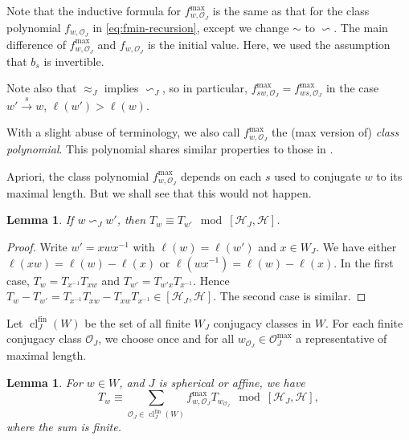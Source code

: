 \documentclass[a4paper, reqno, 14pt]{amsart}
\def\i{{^{-1}}}
\def\co{\mathcal{O}}
\def\ch{\mathcal{H}}
\DeclareMathOperator{\cl}{cl}
\DeclareMathOperator{\fin}{fin}
\newtheorem{lem}[thm]{Lemma}
\theoremstyle{definition}
\theoremstyle{remark}
\numberwithin{equation}{section}
\numberwithin{thm}{section}
\begin{document}
        Note that the inductive formula for $f^{\max}_{w,\co_J}$ is the same as that for the class polynomial $f_{w,\co_J}$ in \cref{eq:fmin-recursion}, except we change $\sim$ to $\backsim$. The main difference of $f^{\max}_{w,\co_J}$ and $f_{w,\co_J}$ is the initial value. Here, we used the assumption that $b_s$ is invertible.

        Note also that $\approx_J$ implies $\backsim_J$, so in particular, $f^{\max}_{s w,\co_J}=f^{\max}_{ws,\co_J}$ in the case $w' \xrightarrow{s} w$, $\ell(w')>\ell(w)$.

        With a slight abuse of terminology, we also call $f^{\max}_{w,\co_J}$ the (max version of) \emph{class polynomial}. This polynomial shares similar properties to those in \cite[\S 8.2]{geck2000characters}.

        Apriori, the class polynomial $f^{\max}_{w,\co_J}$ depends on each $s$ used to conjugate $w$ to its maximal length. But we shall see that this would not happen. 

        
        \begin{lem}\label{lem:sameimg}
            If $w\backsim_J w'$, then $T_w\equiv T_{w'} \mod [\ch_J,\ch]$.
        \end{lem}
        \begin{proof}
            Write $w'=xwx\i$ with $\ell(w)=\ell(w')$ and $x\in W_J$. We have either $\ell(xw)=\ell(w)-\ell(x)$ or $\ell(wx\i)=\ell(w)-\ell(x)$. In the first case, $T_w=T_{x\i}T_{xw}$ and $T_{w'}=T_{w'x}T_{x\i}$. Hence $T_w-T_{w'}=T_{x\i}T_{xw}-T_{xw}T_{x\i}\in [\ch_J,\ch]$. The second case is similar.
        \end{proof}

        Let $\cl^{\fin}_J(W)$ be the set of all finite $W_J$ conjugacy classes in $W$. For each finite conjugacy class $\co_J$, we choose once and for all $w_{\co_J}\in \co^{\max}_J$ a representative of maximal length.
        \begin{lem}\label{lem:Tw_and_class_poly}
            For $w\in W$, and $J$ is spherical or affine, we have
            \begin{equation}
                T_w\equiv \sum_{\co_J\in \cl^{\fin}_J(W)} f^{\max}_{w,\co_J} T_{w_{\co_J}} \mod [\ch_J,\ch],\label{eqn:linearcomb}
            \end{equation}
            where the sum is finite.
        \end{lem}
        
\end{document}
